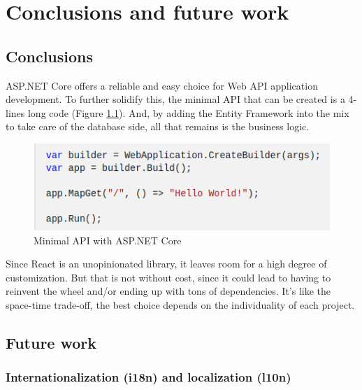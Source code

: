 \chapter{Conclusions and future work}
\label{conclusions}

\section{Conclusions}
\par ASP.NET Core offers a reliable and easy choice for Web API application development. To further solidify this, the minimal API that can be created is a 4-lines long code (Figure \ref{fig:conclusions_minimal-web-api}). And, by adding the Entity Framework into the mix to take care of the database side, all that remains is the business logic.

\begin{figure}[!ht]
    \centering
    \includegraphics[width=1\linewidth]{conclusions_minimal-web-api.png}
    \caption{Minimal API with ASP.NET Core \cite{microsoftMinimalApi}}
    \label{fig:conclusions_minimal-web-api}
\end{figure}

Since React is an unopinionated library, it leaves room for a high degree of customization. But that is not without cost, since it could lead to having to reinvent the wheel and/or ending up with tons of dependencies. It's like the space-time trade-off, the best choice depends on the individuality of each project.

\section{Future work}

\subsection{Internationalization (i18n) and localization (l10n)} 

